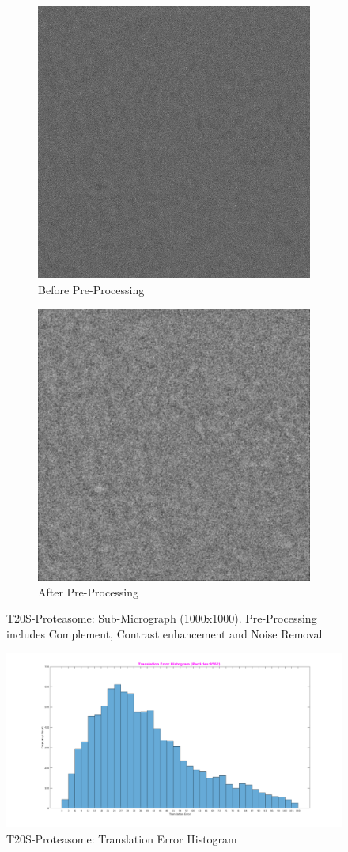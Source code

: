 \documentclass[twoside]{iitbreport}
\begin{document}
\begin{figure}[H]
\centering
\begin{subfigure}{.5\linewidth}
\centering
\includegraphics[width=0.5\linewidth]{fasterrcnn-input-no-prepocess.jpg}
\captionsetup{justification=centering}
\caption{ Before Pre-Processing}
\end{subfigure} 
\begin{subfigure}{.48\linewidth}
\centering
\includegraphics[width=0.5\linewidth]{fasterrcnn-input-with-prepocess.jpg}
\captionsetup{justification=centering}
\caption{ After Pre-Processing}
\end{subfigure}
\captionsetup{justification=centering}
\caption{ T20S-Proteasome: Sub-Micrograph (1000x1000). Pre-Processing includes Complement, Contrast enhancement and Noise Removal}
\label{fig: fasterrcnn-inputimage}
\end{figure}

\begin{figure}[h]
\centering
\includegraphics[width=0.68\linewidth]{fasterrcnn-EM10025-Translation_Error_Histogram.png}
\captionsetup{justification=centering}
\caption{ T20S-Proteasome: Translation Error Histogram}
\label{fig: fasterrcnn-T20S-Proteasome-Translation_Error_Histogram}
\end{figure}
\end{document}
